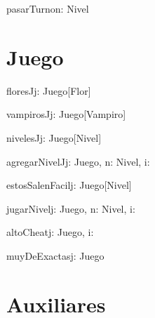 \documentclass[spanish,a4paper]{article}
\begin{document}
\noindent{}

\begin{problema}{pasarTurno}{n: Nivel}{}
\end{problema}




\section{Juego}


\begin{problema}{floresJ}{j: Juego}{[Flor]}
\end{problema}

\begin{problema}{vampirosJ}{j: Juego}{[Vampiro]}
\end{problema}

\begin{problema}{nivelesJ}{j: Juego}{[Nivel]}
\end{problema}

\begin{problema}{agregarNivelJ}{j: Juego, n: Nivel, i: \ent}{}
\end{problema}

\begin{problema}{estosSalenFacil}{j: Juego}{[Nivel]}
\end{problema}

\begin{problema}{jugarNivel}{j: Juego, n: Nivel, i: \ent}{}
\end{problema}

\begin{problema}{altoCheat}{j: Juego, i: \ent}{}
\end{problema}

\begin{problema}{muyDeExactas}{j: Juego}{\bool}
\end{problema}

\section{Auxiliares}
\end{document}

